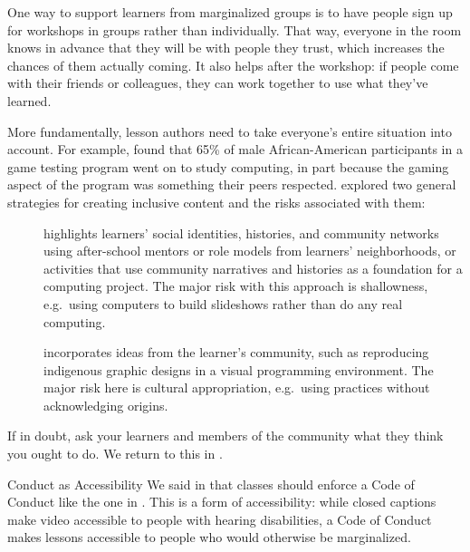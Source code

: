 One way to support learners from marginalized groups is
to have people sign up for workshops in groups rather than individually.
That way,
everyone in the room knows in advance that they will be with people they trust,
which increases the chances of them actually coming.
It also helps after the workshop:
if people come with their friends or colleagues,
they can work together to use what they've learned.

More fundamentally,
lesson authors need to take everyone's entire situation into account.
For example,
\cite{DiSa2014a} found that 65\% of male African-American participants in a game testing program went on to study computing,
in part because the gaming aspect of the program was something their peers respected.
\cite{Lach2018} explored two general strategies for creating inclusive content
and the risks associated with them:

\begin{description}

\item[{}]
  highlights learners' social identities, histories, and community networks
  using after-school mentors or role models from learners' neighborhoods,
  or activities that use community narratives and histories
  as a foundation for a computing project.
  The major risk with this approach is shallowness,
  e.g.\ using computers to build slideshows rather than do any real computing.

\item[{}]
  incorporates ideas from the learner's community,
  such as reproducing indigenous graphic designs in a visual programming environment.
  The major risk here is cultural appropriation,
  e.g.\ using practices without acknowledging origins.

\end{description}

If in doubt,
ask your learners and members of the community what they think you ought to do.
We return to this in .

\begin{aside}{Conduct as Accessibility}
  We said in  that classes should enforce a Code of Conduct like the one in .
  This is a form of accessibility:
  while closed captions make video accessible to people with hearing disabilities,
  a Code of Conduct makes lessons accessible to people who would otherwise be marginalized.
\end{aside}

